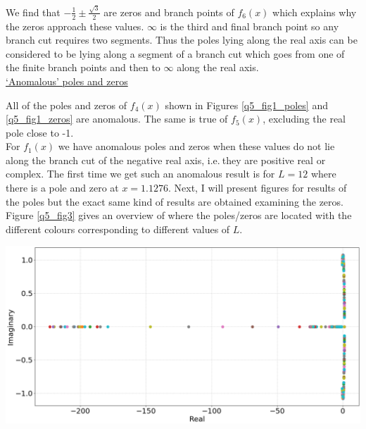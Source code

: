 \documentclass[12pt, a4paper]{article}
\begin{document}
We find that $-\frac{1}{2} \pm \frac{\sqrt{3}}{2}$ are zeros and branch points of $f_{6}(x)$ which
explains why the zeros approach these values. $\infty$ is the third and final branch point so any branch
cut requires two segments. Thus the poles lying along the real axis can be considered to be lying along
a segment of a branch cut which goes from one of the finite branch points and then to $\infty$ along 
the real axis.
\\

\vspace{0.4cm}
\underline{`Anomalous' poles and zeros}

\vspace{0.5cm}
All of the poles and zeros of $f_{4}(x)$ shown in Figures \ref{q5_fig1_poles} and \ref{q5_fig1_zeros}
are anomalous. The same is true of $f_{5}(x)$, excluding the real pole close to -1.
\\

For $f_{1}(x)$ we have anomalous poles and zeros when these values do not lie along the branch cut
of the negative real axis, i.e.$~$they are positive real or complex. The first time we get such an
anomalous result is for $L = 12$ where there is a pole and zero at $x = 1.1276$. Next, I will present 
figures for results of the poles but the exact same kind of results are obtained examining the zeros. 
Figure \ref{q5_fig3} gives an overview of where the poles/zeros are located with the different 
colours corresponding to different values of $L$.

\vspace{0.3cm}
\begin{minipage}{\textwidth}
	\centering
	\includegraphics[width=\linewidth]{q5_fig3}

	\vspace*{-0.3cm}

	\label{q5_fig3}
\end{minipage}
\\
\end{document}
